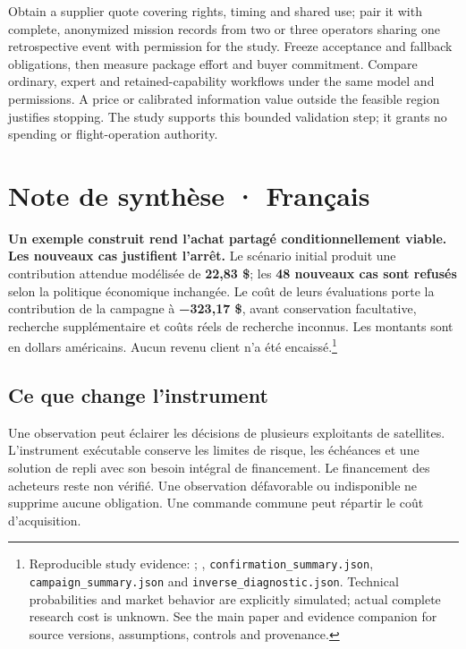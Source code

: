 \documentclass[10pt,letterpaper]{article}
\begin{document}
Obtain a supplier quote covering rights, timing and shared use; pair it
with complete, anonymized mission records from two or three operators
sharing one retrospective event with permission for the study. Freeze
acceptance and fallback obligations, then measure package effort and
buyer commitment. Compare ordinary, expert and retained-capability
workflows under the same model and permissions. A price or calibrated
information value outside the feasible region justifies stopping. The
study supports this bounded validation step; it grants no spending or
flight-operation authority.

\newpage

\hypertarget{note-de-synthuxe8se-franuxe7ais}{%
\section{Note de synthèse ·
Français}\label{note-de-synthuxe8se-franuxe7ais}}

\textbf{Un exemple construit rend l'achat partagé conditionnellement
viable. Les nouveaux cas justifient l'arrêt.} Le scénario initial
produit une contribution attendue modélisée de \textbf{22,83 \$}; les
\textbf{48 nouveaux cas sont refusés} selon la politique économique
inchangée. Le coût de leurs évaluations porte la contribution de la
campagne à \textbf{−323,17 \$}, avant conservation facultative,
recherche supplémentaire et coûts réels de recherche inconnus. Les
montants sont en dollars américains. Aucun revenu client n'a été
encaissé.\footnote{Reproducible study evidence:
  ; ,
  \texttt{confirmation\_summary.json}, \texttt{campaign\_summary.json}
  and \texttt{inverse\_diagnostic.json}. Technical probabilities and
  market behavior are explicitly simulated; actual complete research
  cost is unknown. See the main paper and evidence companion for source
  versions, assumptions, controls and provenance.}

\hypertarget{ce-que-change-linstrument}{%
\subsection{Ce que change
l'instrument}\label{ce-que-change-linstrument}}

Une observation peut éclairer les décisions de plusieurs exploitants de
satellites. L'instrument exécutable conserve les limites de risque, les
échéances et une solution de repli avec son besoin intégral de
financement. Le financement des acheteurs reste non vérifié. Une
observation défavorable ou indisponible ne supprime aucune obligation.
Une commande commune peut répartir le coût d'acquisition.
\end{document}
